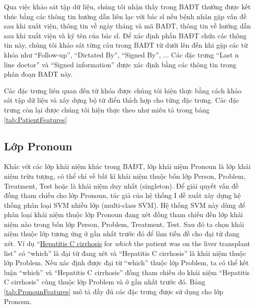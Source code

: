 Qua việc khảo sát tập dữ liệu, chúng tôi nhận thấy trong BAĐT thường được kết thúc bằng các thông tin hướng dẫn liên lạc với bác sĩ nếu bệnh nhân gặp vấn đề sau khi xuất viện, thông tin về ngày tháng và mã BAĐT, thông tin về hướng dẫn sau khi xuất viện và ký tên của bác sĩ. Để xác định phần BAĐT chứa các thông tin này, chúng tôi khảo sát từng câu trong BAĐT từ dưới lên đến khi gặp các từ khóa như ``Follow-up'', ``Dictated By'', ``Signed By'', ... Các đặc trưng ``Last n line doctor'' và ``Signed information'' được xác định bằng các thông tin trong phân đoạn BAĐT này.

Các đặc trưng liên quan đến từ khóa được chúng tôi hiện thực bằng cách khảo sát tập dữ liệu và xây dựng bộ từ điển thích hợp cho từng đặc trưng. Các đặc trưng còn lại được chúng tôi hiện thực theo như miêu tả trong bảng \ref{tab:PatientFeatures}

\subsection*{Lớp Pronoun}
Khác với các lớp khái niệm khác trong BAĐT, lớp khái niệm Pronoun là lớp khái niệm trừu tượng, có thể chỉ về bất kì khái niệm thuộc bốn lớp Person, Problem, Treatment, Test hoặc là khái niệm duy nhất (singleton). Để giải quyết vấn đề đồng tham chiếu cho lớp Pronoun, tác giả của hệ thống I đề xuất xây dựng hệ thống phân loại SVM nhiều lớp (multi-class SVM). Hệ thống SVM này dùng để phân loại khái niệm thuộc lớp Pronoun đang xét đồng tham chiếu đến lớp khái niệm nào trong bốn lớp Person, Problem, Treatment, Test. Sau đó ta chọn khái niệm thuộc lớp tương ứng ở gần nhất trước đó để làm tiền đề cho đại từ đang xét. Ví dụ ``\underline{Hepatitis C cirrhosis} for \textit{which} the patient was on the liver transplant list'' có ``which'' là đại từ đang xét và ``Hepatitis C cirrhosis'' là khái niệm thuộc lớp Problem. Nếu xác định được đại từ ``which'' thuộc lớp Problem, ta có thể kết luận ``which'' và ``Hepatitis C cirrhosis'' đồng tham chiếu do khái niệm ``Hepatitis C cirrhosis'' cùng thuộc lớp Problem và ở gần nhất trước đó. Bảng \ref{tab:PronounFeatures} mô tả đầy đủ các đặc trưng được sử dụng cho lớp Pronoun.

